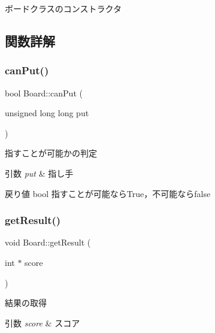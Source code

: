 ボードクラスのコンストラクタ 



\subsection{関数詳解}
\mbox{\label{class_board_a34d2b9e0e4ef4e397741607072f6f88d}} 
\subsubsection{\texorpdfstring{can\+Put()}{canPut()}}
{\footnotesize\ttfamily bool Board\+::can\+Put (\begin{DoxyParamCaption}\item[{unsigned long long}]{put }\end{DoxyParamCaption})\hspace{0.3cm}{\ttfamily [inline]}}



指すことが可能かの判定 


\begin{DoxyParams}{引数}
{\em put} & 指し手 \\
\hline
\end{DoxyParams}
\begin{DoxyReturn}{戻り値}
bool 指すことが可能なら\+True，不可能ならfalse 
\end{DoxyReturn}
\mbox{\label{class_board_acca28e5720f3d476264e18bf2be4e8ad}} 
\subsubsection{\texorpdfstring{get\+Result()}{getResult()}}
{\footnotesize\ttfamily void Board\+::get\+Result (\begin{DoxyParamCaption}\item[{int $\ast$}]{score }\end{DoxyParamCaption})\hspace{0.3cm}{\ttfamily [inline]}}



結果の取得 


\begin{DoxyParams}{引数}
{\em score} & スコア \\
\hline
\end{DoxyParams}
\mbox{\label{class_board_a67cf113c045c8aec1565f48eef8e5770}} 
